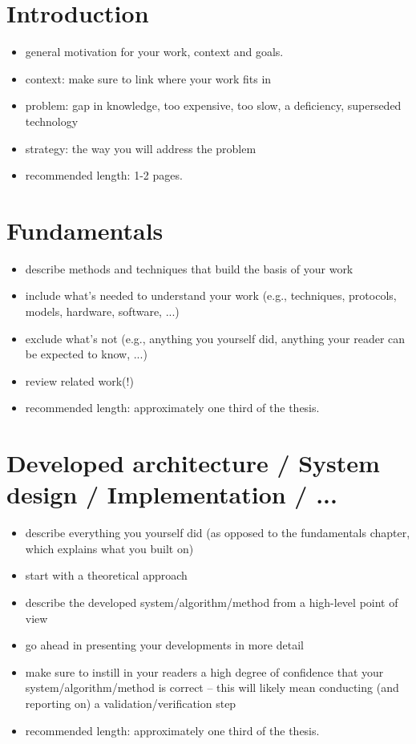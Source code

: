 \chapter{Introduction}
\label{sec:introduction}

\begin{itemize}
\item general motivation for your work, context and goals.
\item context: make sure to link where your work fits in
\item problem: gap in knowledge, too expensive, too slow, a deficiency, superseded technology
\item strategy: the way you will address the problem
\item recommended length: 1-2 pages.
\end{itemize}


\chapter{Fundamentals}
\label{sec:fundamentals}


\begin{itemize}
\item describe methods and techniques that build the basis of your work
\item include what's needed to understand your work (e.g., techniques, protocols, models, hardware, software, ...)
\item exclude what's not (e.g., anything you yourself did, anything your reader can be expected to know, ...)
\item review related work(!)
\item recommended length: approximately one third of the thesis.
\end{itemize}


\chapter{Developed architecture / System design / Implementation / ...}


\begin{itemize}
\item describe everything you yourself did (as opposed to the fundamentals chapter, which explains what you built on)
\item start with a theoretical approach
\item describe the developed system/algorithm/method from a high-level point of view
\item go ahead in presenting your developments in more detail
\item make sure to instill in your readers a high degree of confidence that your system/algorithm/method is correct -- this will likely mean conducting (and reporting on) a validation/verification step
\item recommended length: approximately one third of the thesis.
\end{itemize}



